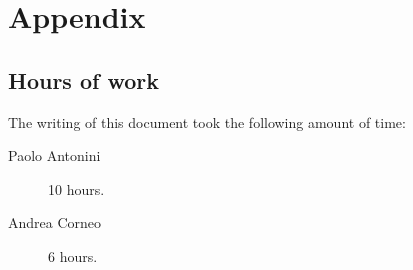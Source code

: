 \chapter{Appendix}\label{chap:appendix}

\section*{Hours of work}
The writing of this document took the following amount of time:

\begin{description}
	\item [Paolo Antonini] 10 hours.
	\item [Andrea Corneo] 6 hours.
\end{description}



